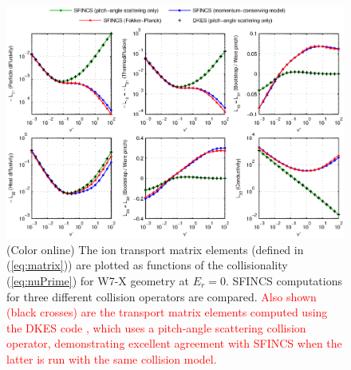 \documentclass[12pt,superscriptaddress]{revtex4}
\newcommand{\changed}[1]{\textcolor{red}{#1}}
\begin{document}
\begin{figure}[h!]
\includegraphics{m20140205_01_plotSFINCSFortranAndMatlabNuScansForPaper_W7X.eps}
\caption{(Color online)
The ion transport matrix elements (defined in (\ref{eq:matrix})) are plotted as functions
of the collisionality (\ref{eq:nuPrime}) for W7-X geometry at $E_r=0$.
SFINCS computations for three different collision operators are compared.
\changed{
Also shown (black crosses) are the transport matrix elements
computed using the DKES code \cite{DKES1,DKES2}, which uses a pitch-angle scattering collision operator,
demonstrating excellent agreement with SFINCS when the latter is run with the same collision model. 
}
\label{fig:collisionComparison_W7X}}
\end{figure}
\end{document}
